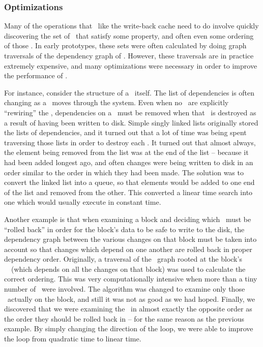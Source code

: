 \subsubsection {Optimizations}
Many of the operations that \modules\ like the write-back cache need to do
involve quickly discovering the set of \chdescs\ that satisfy some property,
and often even some ordering of those \chdescs. In early prototypes, these sets
were often calculated by doing graph traversals of the dependency graph of
\chdescs. However, these traversals are in practice extremely expensive, and
many optimizations were necessary in order to improve the performance of
\Kudos.

For instance, consider the structure of a \chdesc\ itself. The list of
dependencies is often changing as a \chdesc\ moves through the system. Even
when no \modules\ are explicitly ``rewiring'' the \chdescs, dependencies on a
\chdesc\ must be removed when that \chdesc\ is destroyed as a result of having
been written to disk. Simple singly linked lists originally stored the lists of
dependencies, and it turned out that a lot of time was being spent traversing
those lists in order to destroy each \chdesc. It turned out that almost always,
the element being removed from the list was at the end of the list -- because
it had been added longest ago, and often changes were being written to disk in
an order similar to the order in which they had been made. The solution was to
convert the linked list into a queue, so that elements would be added to one
end of the list and removed from the other. This converted a linear time search
into one which would usually execute in constant time.

Another example is that when examining a block and deciding which \chdescs\
must be ``rolled back'' in order for the block's data to be safe to write to
the disk, the dependency graph between the various changes on that block must
be taken into account so that changes which depend on one another are rolled
back in proper dependency order. Originally, a traversal of the \chdesc\ graph
rooted at the block's \noop\ \chdesc\ (which depends on all the changes on that
block) was used to calculate the correct ordering. This was very
computationally intensive when more than a tiny number of \chdescs\ were
involved. The algorithm was changed to examine only those \chdescs\ actually on
the block, and still it was not as good as we had hoped. Finally, we discovered
that we were examining the \chdescs\ in almost exactly the opposite order as
the order they should be rolled back in -- for the same reason as the previous
example. By simply changing the direction of the loop, we were able to improve
the loop from quadratic time to linear time.

